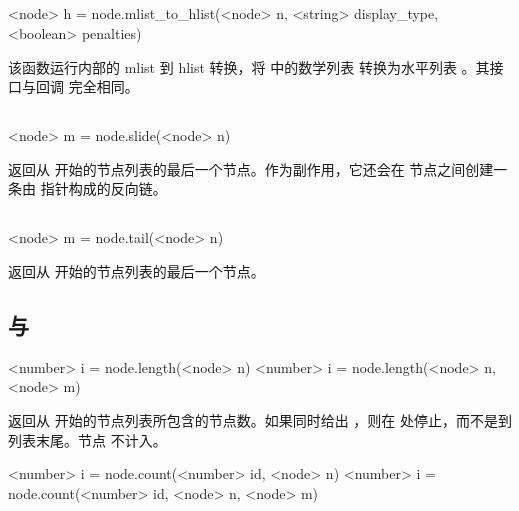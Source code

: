 \subsection{}


\begin{typing}
<node> h =
    node.mlist_to_hlist(<node> n, <string> display_type, <boolean> penalties)
\end{typing}

该函数运行内部的 mlist 到 hlist 转换，将  中的数学列表
转换为水平列表 。其接口与回调  完全相同。

\subsection{}

\begin{typing}
<node> m =
    node.slide(<node> n)
\end{typing}

返回从  开始的节点列表的最后一个节点。作为副作用，它还会在
节点之间创建一条由  指针构成的反向链。

\subsection{}


\begin{typing}
<node> m =
    node.tail(<node> n)
\end{typing}

返回从  开始的节点列表的最后一个节点。

\subsection{ 与 }


\begin{typing}
<number> i =
    node.length(<node> n)
<number> i =
    node.length(<node> n, <node> m)
\end{typing}

返回从  开始的节点列表所包含的节点数。如果同时给出
，则在  处停止，而不是到列表末尾。节点 
不计入。

\begin{typing}
<number> i =
    node.count(<number> id, <node> n)
<number> i =
    node.count(<number> id, <node> n, <node> m)
\end{typing}

